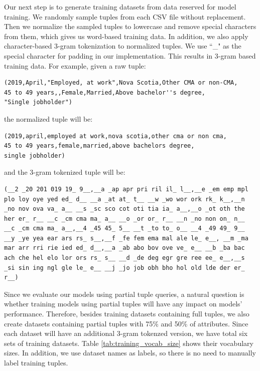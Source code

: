 Our next step is to generate training datasets from data reserved for model training. We randomly sample tuples from each CSV file without replacement. Then we normalize the sampled tuples to lowercase and remove special characters from them, which gives us word-based training data. In addition, we also apply character-based 3-gram tokenization to normalized tuples. We use ``\_" as the special character for padding in our implementation.  This results in 3-gram based training data. For example, given a raw tuple:
\begin{verbatim}
(2019,April,"Employed, at work",Nova Scotia,Other CMA or non-CMA,
45 to 49 years,,Female,Married,Above bachelor''s degree,
"Single jobholder")
\end{verbatim}
the normalized tuple will be:
\begin{verbatim}
(2019,april,employed at work,nova scotia,other cma or non cma,
45 to 49 years,female,married,above bachelors degree,
single jobholder)
\end{verbatim}
and the 3-gram tokenized tuple will be:
\begin{verbatim}
(__2 _20 201 019 19_ 9__,__a _ap apr pri ril il_ l__,__e _em emp mpl
plo loy oye yed ed_ d__ __a _at at_ t__ __w _wo wor ork rk_ k__,__n 
_no nov ova va_ a__ __s _sc sco cot oti tia ia_ a__,__o _ot oth the 
her er_ r__ __c _cm cma ma_ a__ __o _or or_ r__ __n _no non on_ n__ 
__c _cm cma ma_ a__,__4 _45 45_ 5__ __t _to to_ o__ __4 _49 49_ 9__ 
__y _ye yea ear ars rs_ s__,__f _fe fem ema mal ale le_ e__, __m _ma
mar arr rri rie ied ed_ d__,__a _ab abo bov ove ve_ e__ __b _ba bac
ach che hel elo lor ors rs_ s__ __d _de deg egr gre ree ee_ e__,__s
_si sin ing ngl gle le_ e__ __j _jo job obh bho hol old lde der er_
r__)
\end{verbatim}
Since we evaluate our models using partial tuple queries, a natural question is whether training models using partial tuples will have any impact on models' performance. Therefore, besides training datasets containing full tuples, we also create datasets containing partial tuples with 75\% and 50\% of attributes. Since each dataset will have an additional 3-gram tokenzed version, we have total six sets of training datasets. Table \ref{tab:training_vocab_size} shows their vocabulary sizes. In addition, we use dataset names as labels, so there is no need to manually label training tuples.
